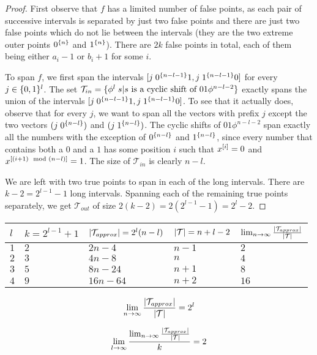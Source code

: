 \begin{proof}
First observe that $f$
has a limited number of false points,
as each pair of successive intervals
is separated by just two false points
and there are just two false points
which do not lie between the intervals
(they are the two extreme outer points
$0^{\{n\}}$ and $1^{\{n\}}$).
There are $2k$ false points in total,
each of them being either $a_i - 1$ or $b_i + 1$
for some $i$.

To span $f$,
we first span the intervals
$[j \; 0^{\{n-l-1\}} 1, j \; 1^{\{n-l-1\}} 0]$
for every $j \in \{0, 1\}^l$.
The set
$\mathcal{T}_{in} =
\{\phi^l \; s |
s \text{ is a cyclic shift of } 01 \phi^{n-l-2}\}$
exactly spans the union of the intervals
$[j \; 0^{\{n-l-1\}} 1, j \; 1^{\{n-l-1\}} 0]$.
To see that it actually does,
observe that for every $j$,
we want to span all the vectors with prefix $j$
except the two vectors $(j \; 0^{\{n-l\}})$
and $(j \; 1^{\{n-l\}})$.
The cyclic shifts of $01 \phi^{n-l-2}$ span exactly
all the numbers with the exception of
$0^{\{n-l\}}$ and $1^{\{n-l\}}$,
since every number that contains both a $0$ and a $1$
has some position $i$ such that
$x^{[i]} = 0$
and $x^{[(i+1) \mod (n-l)]} = 1$.
The size of $\mathcal{T}_{in}$ is clearly $n-l$.

We are left with two true points to span
in each of the long intervals.
There are $k-2 = 2^{l-1} - 1$ long intervals.
Spanning each of the remaining true points separately,
we get $\mathcal{T}_{out}$ of size
$2(k-2) = 2(2^{l-1}-1) = 2^l - 2$.

\end{proof}

\begin{center}
\begin{tabular}{l|llll}
$l$
& $k = 2^{l-1} + 1$
& $\lvert\mathcal{T}_{approx}\rvert = 2^l (n-l)$
& $\lvert\mathcal{T}\rvert = n + l - 2$
& $\lim_{n \rightarrow \infty}
{\frac{\lvert\mathcal{T}_{approx}\rvert}{\lvert\mathcal{T}\rvert}}$
\\
\hline
$1$ & $2$ & $2n-4$ & $n-1$ & $2$ \\
$2$ & $3$ & $4n-8$ & $n$ & $4$ \\
$3$ & $5$ & $8n-24$ & $n+1$ & $8$ \\
$4$ & $9$ & $16n-64$ & $n+2$ & $16$
\end{tabular}
\end{center}

\[
\lim_{n \rightarrow \infty}{
\frac{\lvert\mathcal{T}_{approx}\rvert}{\lvert\mathcal{T}\rvert}
}
=
2^l
\]

\[
\lim_{l \rightarrow \infty}{
\frac{
\lim_{n \rightarrow \infty}{
\frac{\lvert\mathcal{T}_{approx}\rvert}{\lvert\mathcal{T}\rvert}
}
}{k}
}
=
2
\]


